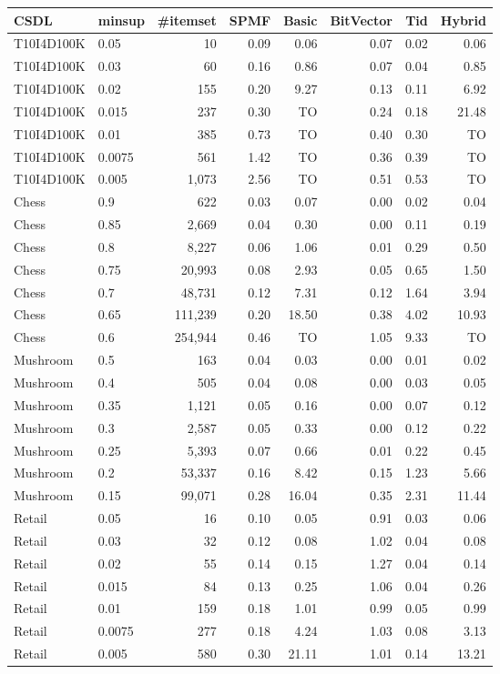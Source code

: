 \begin{tabular}{ll rrrrrr}
\toprule
CSDL & minsup & \#itemset & SPMF & Basic & BitVector & Tid & Hybrid \\
\midrule
T10I4D100K & 0.05 & 10 & 0.09 & 0.06 & 0.07 & 0.02 & 0.06 \\
T10I4D100K & 0.03 & 60 & 0.16 & 0.86 & 0.07 & 0.04 & 0.85 \\
T10I4D100K & 0.02 & 155 & 0.20 & 9.27 & 0.13 & 0.11 & 6.92 \\
T10I4D100K & 0.015 & 237 & 0.30 & TO & 0.24 & 0.18 & 21.48 \\
T10I4D100K & 0.01 & 385 & 0.73 & TO & 0.40 & 0.30 & TO \\
T10I4D100K & 0.0075 & 561 & 1.42 & TO & 0.36 & 0.39 & TO \\
T10I4D100K & 0.005 & 1{,}073 & 2.56 & TO & 0.51 & 0.53 & TO \\
Chess & 0.9 & 622 & 0.03 & 0.07 & 0.00 & 0.02 & 0.04 \\
Chess & 0.85 & 2{,}669 & 0.04 & 0.30 & 0.00 & 0.11 & 0.19 \\
Chess & 0.8 & 8{,}227 & 0.06 & 1.06 & 0.01 & 0.29 & 0.50 \\
Chess & 0.75 & 20{,}993 & 0.08 & 2.93 & 0.05 & 0.65 & 1.50 \\
Chess & 0.7 & 48{,}731 & 0.12 & 7.31 & 0.12 & 1.64 & 3.94 \\
Chess & 0.65 & 111{,}239 & 0.20 & 18.50 & 0.38 & 4.02 & 10.93 \\
Chess & 0.6 & 254{,}944 & 0.46 & TO & 1.05 & 9.33 & TO \\
Mushroom & 0.5 & 163 & 0.04 & 0.03 & 0.00 & 0.01 & 0.02 \\
Mushroom & 0.4 & 505 & 0.04 & 0.08 & 0.00 & 0.03 & 0.05 \\
Mushroom & 0.35 & 1{,}121 & 0.05 & 0.16 & 0.00 & 0.07 & 0.12 \\
Mushroom & 0.3 & 2{,}587 & 0.05 & 0.33 & 0.00 & 0.12 & 0.22 \\
Mushroom & 0.25 & 5{,}393 & 0.07 & 0.66 & 0.01 & 0.22 & 0.45 \\
Mushroom & 0.2 & 53{,}337 & 0.16 & 8.42 & 0.15 & 1.23 & 5.66 \\
Mushroom & 0.15 & 99{,}071 & 0.28 & 16.04 & 0.35 & 2.31 & 11.44 \\
Retail & 0.05 & 16 & 0.10 & 0.05 & 0.91 & 0.03 & 0.06 \\
Retail & 0.03 & 32 & 0.12 & 0.08 & 1.02 & 0.04 & 0.08 \\
Retail & 0.02 & 55 & 0.14 & 0.15 & 1.27 & 0.04 & 0.14 \\
Retail & 0.015 & 84 & 0.13 & 0.25 & 1.06 & 0.04 & 0.26 \\
Retail & 0.01 & 159 & 0.18 & 1.01 & 0.99 & 0.05 & 0.99 \\
Retail & 0.0075 & 277 & 0.18 & 4.24 & 1.03 & 0.08 & 3.13 \\
Retail & 0.005 & 580 & 0.30 & 21.11 & 1.01 & 0.14 & 13.21 \\
\bottomrule
\end{tabular}